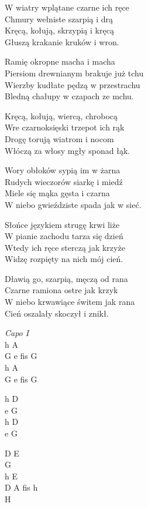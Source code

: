 \begin{text}
    \ifchorded{\hfill\break}
    W wiatry wplątane czarne ich ręce\\
    Chmury wełniste szarpią i drą\\
    Kręcą, kołują, skrzypią i kręcą\\
    Głuszą krakanie kruków i wron.

    Ramię okropne macha i macha\\
    Piersiom drewnianym brakuje już tchu\\
    Wierzby kudłate pędzą w przestrachu\\
    Bledną chałupy w czapach ze mchu.

    Kręcą, kołują, wiercą, chrobocą\\
    Wre czarnoksięski trzepot ich rąk\\
    Drogę torują wiatrom i nocom\\
    Włóczą za włosy mgły sponad łąk.

    Wory obłoków sypią im w żarna\\
    Rudych wieczorów siarkę i miedź\\
    Miele się mąka gęsta i czarna\\
    W niebo gwieździste spada jak w sieć.

    Słońce językiem strugę krwi liże\\
    W pianie zachodu tarza się dzień\\
    Wtedy ich ręce sterczą jak krzyże\\
    Widzę rozpięty na nich mój cień.

    Dławią go, szarpią, męczą od rana\\
    Czarne ramiona ostre jak krzyk\\
    W niebo krwawiące świtem jak rana\\
    Cień oszalały skoczył i znikł.
\end{text}
\begin{chord}
    \textit{Capo I}\\
    h A\\
    G e fis G\\
    h A\\
    G e fis G

    h D\\
    e G\\
    h D\\
    e G

    D E\\
    G\\
    h E\\
    D A fis h\\
    H
\end{chord}
